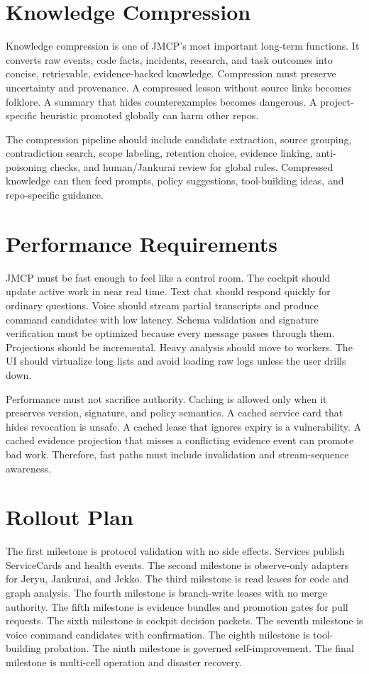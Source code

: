 \documentclass[10pt,journal,onecolumn]{IEEEtran}
\begin{document}
\section{Knowledge Compression}
Knowledge compression is one of JMCP's most important long-term functions. It converts raw events, code facts, incidents, research, and task outcomes into concise, retrievable, evidence-backed knowledge. Compression must preserve uncertainty and provenance. A compressed lesson without source links becomes folklore. A summary that hides counterexamples becomes dangerous. A project-specific heuristic promoted globally can harm other repos.

The compression pipeline should include candidate extraction, source grouping, contradiction search, scope labeling, retention choice, evidence linking, anti-poisoning checks, and human/Jankurai review for global rules. Compressed knowledge can then feed prompts, policy suggestions, tool-building ideas, and repo-specific guidance.

\section{Performance Requirements}
JMCP must be fast enough to feel like a control room. The cockpit should update active work in near real time. Text chat should respond quickly for ordinary questions. Voice should stream partial transcripts and produce command candidates with low latency. Schema validation and signature verification must be optimized because every message passes through them. Projections should be incremental. Heavy analysis should move to workers. The UI should virtualize long lists and avoid loading raw logs unless the user drills down.

Performance must not sacrifice authority. Caching is allowed only when it preserves version, signature, and policy semantics. A cached service card that hides revocation is unsafe. A cached lease that ignores expiry is a vulnerability. A cached evidence projection that misses a conflicting evidence event can promote bad work. Therefore, fast paths must include invalidation and stream-sequence awareness.

\section{Rollout Plan}
The first milestone is protocol validation with no side effects. Services publish ServiceCards and health events. The second milestone is observe-only adapters for Jeryu, Jankurai, and Jekko. The third milestone is read leases for code and graph analysis. The fourth milestone is branch-write leases with no merge authority. The fifth milestone is evidence bundles and promotion gates for pull requests. The sixth milestone is cockpit decision packets. The seventh milestone is voice command candidates with confirmation. The eighth milestone is tool-building probation. The ninth milestone is governed self-improvement. The final milestone is multi-cell operation and disaster recovery.
\end{document}
